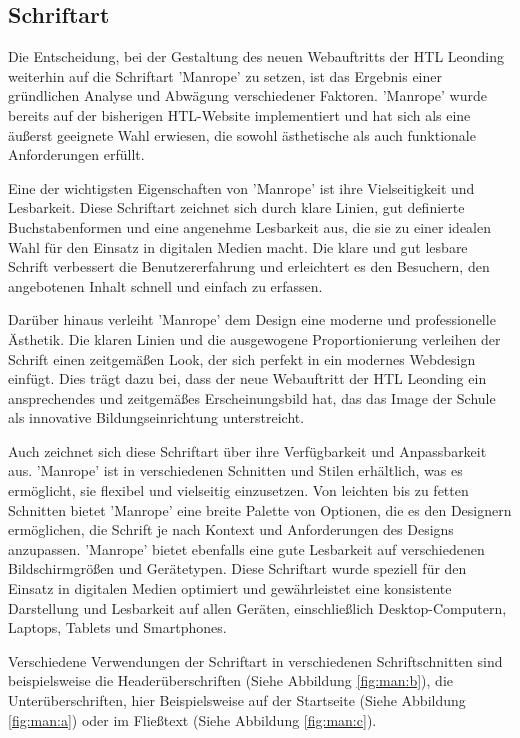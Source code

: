\subsection{Schriftart}

Die Entscheidung, bei der Gestaltung des neuen Webauftritts der HTL Leonding weiterhin auf die Schriftart 'Manrope' zu setzen, 
ist das Ergebnis einer gründlichen Analyse und Abwägung verschiedener Faktoren. 'Manrope' wurde bereits auf der bisherigen HTL-Website 
implementiert und hat sich als eine äußerst geeignete Wahl erwiesen, die sowohl ästhetische als auch funktionale Anforderungen erfüllt.

Eine der wichtigsten Eigenschaften von 'Manrope' ist ihre Vielseitigkeit und Lesbarkeit. Diese Schriftart zeichnet sich durch klare Linien, 
gut definierte Buchstabenformen und eine angenehme Lesbarkeit aus, die sie zu einer idealen Wahl für den Einsatz in digitalen Medien macht. 
Die klare und gut lesbare Schrift verbessert die Benutzererfahrung und erleichtert es den Besuchern, den angebotenen Inhalt schnell und 
einfach zu erfassen.

Darüber hinaus verleiht 'Manrope' dem Design eine moderne und professionelle Ästhetik. Die klaren Linien und die ausgewogene Proportionierung 
verleihen der Schrift einen zeitgemäßen Look, der sich perfekt in ein modernes Webdesign einfügt. Dies trägt dazu bei, dass der neue Webauftritt 
der HTL Leonding ein ansprechendes und zeitgemäßes Erscheinungsbild hat, das das Image der Schule als innovative Bildungseinrichtung unterstreicht.

Auch zeichnet sich diese Schriftart über ihre Verfügbarkeit und Anpassbarkeit aus. 'Manrope' ist in verschiedenen Schnitten und 
Stilen erhältlich, was es ermöglicht, sie flexibel und vielseitig einzusetzen. Von leichten bis zu fetten Schnitten bietet 
'Manrope' eine breite Palette von Optionen, die es den Designern ermöglichen, die Schrift je nach Kontext und Anforderungen des Designs 
anzupassen.
'Manrope' bietet ebenfalls eine gute Lesbarkeit auf verschiedenen Bildschirmgrößen und Gerätetypen. Diese Schriftart wurde 
speziell für den Einsatz in digitalen Medien optimiert und gewährleistet eine konsistente Darstellung und Lesbarkeit auf allen Geräten, 
einschließlich Desktop-Computern, Laptops, Tablets und Smartphones.

Verschiedene Verwendungen der Schriftart in verschiedenen Schriftschnitten sind beispielsweise die Headerüberschriften (Siehe Abbildung \ref{fig:man:b}), 
die Unterüberschriften, hier Beispielsweise auf der Startseite (Siehe Abbildung \ref{fig:man:a}) oder im Fließtext (Siehe Abbildung \ref{fig:man:c}).

